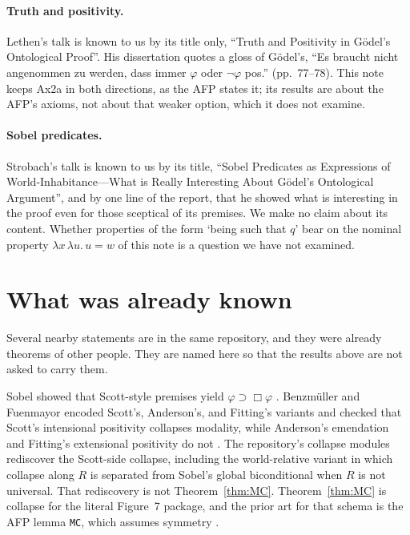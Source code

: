 \documentclass[11pt,a4paper]{article}
\newcommand{\Nec}{\Box}
\newcommand{\lean}[1]{\texttt{#1}}
\theoremstyle{definition}
\theoremstyle{remark}
\begin{document}
\paragraph{Truth and positivity.}
Lethen's talk is known to us by its title only, ``Truth and Positivity in
G\"odel's Ontological Proof''.
His dissertation \cite{lethen2026diss} quotes a gloss of G\"odel's,
``Es braucht nicht angenommen zu werden, dass immer \(\varphi\) oder
\(\neg\varphi\) pos.'' (pp.~77--78).
This note keeps Ax2a in both directions, as the AFP states it; its results
are about the AFP's axioms, not about that weaker option, which it does not
examine.

\paragraph{Sobel predicates.}
Strobach's talk is known to us by its title, ``Sobel Predicates as
Expressions of World-Inhabitance---What is Really Interesting About G\"odel's
Ontological Argument'', and by one line of the report, that he showed what is
interesting in the proof even for those sceptical of its premises.
We make no claim about its content.
Whether properties of the form `being such that \(q\)' bear on the nominal
property \(\lambda x\,\lambda u.\,u=w\) of this note is a question we
have not examined.

\section{What was already known}
\label{sec:related}

Several nearby statements are in the same repository, and they were already
theorems of other people.
They are named here so that the results above are not asked to carry them.

Sobel showed that Scott-style premises yield \(\varphi \supset \Nec\varphi\)
\cite{sobel1987,sobel2004}.
Benzm\"uller and Fuenmayor encoded Scott's, Anderson's, and Fitting's
variants and checked that Scott's intensional positivity collapses modality,
while Anderson's emendation and Fitting's extensional positivity do not
\cite{benzmuellerFuenmayor2020,anderson1990,andersonGettings1996,fitting2002}.
The repository's collapse modules rediscover the Scott-side collapse, including
the world-relative variant in which collapse along \(R\) is separated from
Sobel's global biconditional when \(R\) is not universal.
That rediscovery is not Theorem~\ref{thm:MC}.
Theorem~\ref{thm:MC} is collapse for the literal Figure~7 package, and the
prior art for that schema is the AFP lemma \lean{MC}, which assumes symmetry
\cite{afpNotes2025}.
\end{document}
